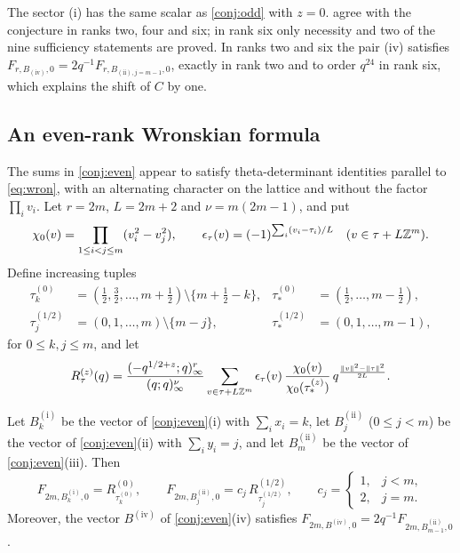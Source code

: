 The sector (i) has the same scalar as \cref{conj:odd} with $z=0$.  agree with the conjecture in ranks two, four and six; in rank six only necessity and two of the nine sufficiency statements are proved. In ranks two and six the pair (iv) satisfies $F_{r,B_{\mathrm{(iv)}},0}=2q^{-1}F_{r,B_{\mathrm{(ii)},j=m-1},0}$, exactly in rank two and to order $q^{24}$ in rank six, which explains the shift of $C$ by one.

\subsection{An even-rank Wronskian formula}
The sums in \cref{conj:even} appear to satisfy theta-determinant identities parallel to \eqref{eq:wron}, with an alternating character on the lattice and without the factor $\prod_iv_i$. Let $r=2m$, $L=2m+2$ and $\nu=m(2m-1)$, and put
\[
\chi_0(v)=\prod_{1\le i<j\le m}(v_i^2-v_j^2),\qquad \epsilon_\tau(v)=(-1)^{\sum_i(v_i-\tau_i)/L}\quad(v\in\tau+L\mathbb{Z}^m).
\]
Define increasing tuples
\begin{align*}
\tau^{(0)}_k&=(\tfrac12,\tfrac32,\dots,m+\tfrac12)\setminus\{m+\tfrac12-k\}, & \tau^{(0)}_*&=(\tfrac12,\dots,m-\tfrac12),\\
\tau^{(1/2)}_j&=(0,1,\dots,m)\setminus\{m-j\}, & \tau^{(1/2)}_*&=(0,1,\dots,m-1),
\end{align*}
for $0\le k,j\le m$, and let
\[
R^{(z)}_\tau(q)=\frac{(-q^{1/2+z};q)_\infty^r}{(q;q)_\infty^\nu}\sum_{v\in\tau+L\mathbb{Z}^m}\epsilon_\tau(v)\,\frac{\chi_0(v)}{\chi_0(\tau^{(z)}_*)}\,q^{\frac{\|v\|^2-\|\tau\|^2}{2L}}.
\]

\begin{conjecture}\label{conj:evenwron}
Let $B^{\mathrm{(i)}}_k$ be the vector of \cref{conj:even}(i) with $\sum_ix_i=k$, let $B^{\mathrm{(ii)}}_j$ ($0\le j<m$) be the vector of \cref{conj:even}(ii) with $\sum_iy_i=j$, and let $B^{\mathrm{(ii)}}_m$ be the vector of \cref{conj:even}(iii). Then
\[
F_{2m,B^{\mathrm{(i)}}_k,0}=R^{(0)}_{\tau^{(0)}_k},\qquad F_{2m,B^{\mathrm{(ii)}}_j,0}=c_j\,R^{(1/2)}_{\tau^{(1/2)}_j},\qquad c_j=\begin{cases}1,&j<m,\\2,&j=m.\end{cases}
\]
Moreover, the vector $B^{\mathrm{(iv)}}$ of \cref{conj:even}(iv) satisfies $F_{2m,B^{\mathrm{(iv)}},0}=2q^{-1}F_{2m,B^{\mathrm{(ii)}}_{m-1},0}$.
\end{conjecture}

